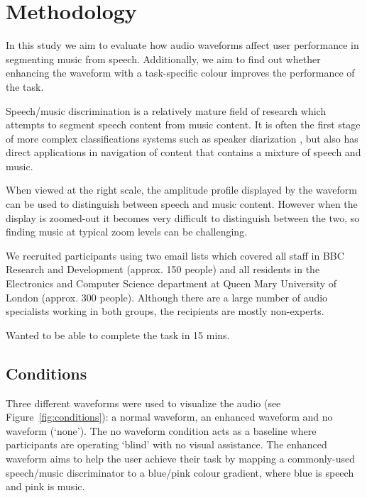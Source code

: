 
\section{Methodology}

In this study we aim to evaluate how audio waveforms affect user performance in segmenting music from speech.
Additionally, we aim to find out whether enhancing the waveform with a task-specific colour improves the performance of
the task.

Speech/music discrimination is a relatively mature field of research which attempts to segment speech content from
music content. It is often the first stage of more complex classifications systems such as speaker diarization
\citep{AngueraMiro2012}, but also has direct applications in navigation of content that contains a mixture of speech
and music.

When viewed at the right scale, the amplitude profile displayed by the waveform can be used to distinguish between
speech and music content. However when the display is zoomed-out it becomes very difficult to distinguish between the
two, so finding music at typical zoom levels can be challenging.


We recruited participants using two email lists which covered all staff in BBC Research and Development (approx. 150
people) and all residents in the Electronics and Computer Science department at Queen Mary University of London
(approx. 300 people). Although there are a large number of audio specialists working in both groups, the recipients are
mostly non-experts.

Wanted to be able to complete the task in 15 mins.

\subsection{Conditions}
Three different waveforms were used to visualize the audio (see Figure~\ref{fig:conditions}): a normal waveform, an
enhanced waveform and no waveform (`none'). The no waveform condition acts as a baseline where participants are
operating `blind' with no visual assistance. The enhanced waveform aims to help the user achieve their task by mapping
a commonly-used speech/music discriminator to a blue/pink colour gradient, where blue is speech and pink is music.

